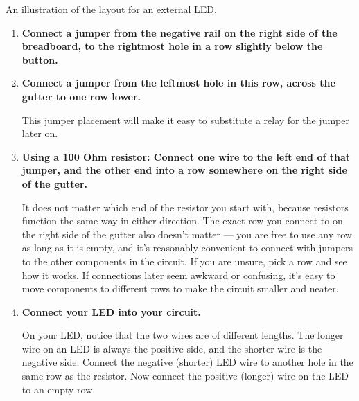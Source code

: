 \begin{marginfigure}[-8cm]
\begin{center}
		\caption[External LED layout]{An illustration of the layout for an external LED. }
	\end{center}
\end{marginfigure}


\begin{enumerate}
	\item \textbf{Connect a jumper from the negative rail on the right side of the breadboard, to the rightmost hole in a row slightly below the button.}
	\item \textbf{Connect a jumper from the leftmost hole in this row, across the gutter to one row lower.}

	This jumper placement will make it easy to substitute a relay for the jumper later on.
	\item \textbf{Using a 100 Ohm resistor: Connect one wire to the left end of that jumper, and the other end into a row somewhere on the right side of the gutter.}

	It does not matter which end of the resistor you start with, because resistors function the same way in either direction.
	The exact row you connect to on the right side of the gutter also doesn't matter --- you are free to use any row as long as it is empty, and it's reasonably convenient to connect with jumpers to the other components in the circuit.
	If you are unsure, pick a row and see how it works.
	If connections later seem awkward or confusing, it's easy to move components to different rows to make the circuit smaller and neater.



	\item \textbf{Connect your LED into your circuit.}

	On your LED, notice that the two wires are of different lengths. The longer wire on an LED is always the positive side, and the shorter wire is the negative side. Connect the negative (shorter) LED wire to another hole in the same row as the resistor. Now connect the positive (longer) wire on the LED to an empty row.


\end{enumerate}
